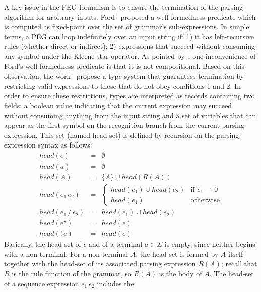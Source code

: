 \documentclass[preprint,12pt]{elsarticle}
\theoremstyle{definition}
\begin{document}
A key issue in the PEG formalism is to ensure the termination of the parsing algorithm
for arbitrary inputs. Ford~\cite{Ford2004} proposed a well-formedness predicate
which is computed as fixed-point over the set of grammar's sub-expressions.
In simple terms, a PEG can loop indefinitely over an input string if: 1) it has
left-recursive rules (whether direct or indirect); 2) expressions that succeed without
consuming any symbol under the Kleene star operator.
As pointed by~\cite{Ribeiro19}, one inconvenience of Ford's well-formedness predicate
is that it is not compositional.
Based on this observation, the work~\cite{Ribeiro19} propose a type
system that guarantees termination by restricting valid expressions to those
that do not obey conditions 1 and 2. In order to ensure these restrictions,
types are interpreted as records containing two fields:
a boolean value indicating that the current expression may succeed without
consuming anything from the input string and a set of variables that can
appear as the first symbol on the recognition branch from the current parsing
expression. This set (named head-set) is defined by recursion on the parsing
expression syntax as follows:
\[
  \begin{array}{lcl}
    head (\epsilon) & = & \emptyset \\
    head (a) & = & \emptyset \\
    head (A) & = & \{A\} \cup head(R(A)) \\
    head (e_1\,e_2) & = & \left\{
                          \begin{array}{ll}
                            head(e_1) \cup head(e_2) & \text{if }e_1 \rightharpoonup 0\\
                            head(e_1) & \text{otherwise}
                          \end{array}
                                        \right. \\
    head(e_1\,/\,e_2) & = & head(e_1) \cup head(e_2) \\
    head(e^\star) & = & head(e) \\
    head(!\,e)    & = & head(e)
  \end{array}
\]
Basically, the head-set of $\epsilon$ and of a terminal $a \in \Sigma$ is empty,
since neither begins with a non terminal. For a non terminal $A$, the head-set is
formed by $A$ itself together with the head-set of its associated parsing
expression $R(A)$; recall that $R$ is the rule function of the grammar, so $R(A)$
is the body of $A$. The head-set of a sequence expression $e_1\,e_2$ includes the
\end{document}
